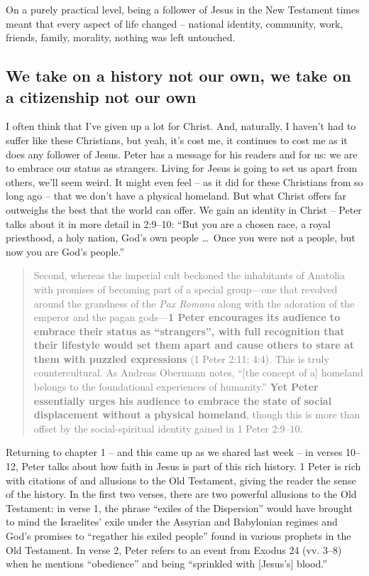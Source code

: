 On a purely practical level, being a follower of Jesus in the New Testament
times meant that every aspect of life changed -- national identity, community,
work, friends, family, morality, nothing was left untouched.

\subsection{%
    We take on a history not our own, we take on a citizenship not our own
}

I often think that I've given up a lot for Christ. And, naturally, I haven't had
to suffer like these Christians, but yeah, it's cost me, it continues to cost me
as it does any follower of Jesus. Peter has a message for his readers and for
us: we are to embrace our status as strangers. Living for Jesus is going to set
us apart from others, we'll seem weird. It might even feel -- as it did for
these Christians from so long ago -- that we don't have a physical homeland. But
what Christ offers far outweighs the best that the world can offer. We gain an
identity in Christ -- Peter talks about it in more detail in 2:9--10:
\enquote{But you are a chosen race, a royal priesthood, a holy nation, God's own
people \dots\ Once you were not a people, but now you are God's people.}

\begin{quote}
    \textcolor{gray}{%
        Second, whereas the imperial cult beckoned the inhabitants of Anatolia
        with promises of becoming part of a special group---one that revolved
        around the grandness of the \textit{Pax Romana} along with the adoration
        of the emperor and the pagan gods---\textbf{1 Peter encourages its
        audience to embrace their status as \enquote{strangers}, with full
        recognition that their lifestyle would set them apart and cause others
        to stare at them with puzzled expressions} (1 Peter 2:11; 4:4). This is
        truly countercultural. As Andreas Obermann notes, \enquote{[the concept
        of a] homeland belongs to the foundational experiences of humanity.}
        \textbf{Yet Peter essentially urges his audience to embrace the state of
        social displacement without a physical homeland}, though this is more
        than offset by the social-spiritual identity gained in 1 Peter 2:9--10.
        \autocite{himes:2017}
    }
\end{quote}

Returning to chapter 1 -- and this came up as we shared last week -- in verses
10--12, Peter talks about how faith in Jesus is part of this rich history. 1
Peter is rich with citations of and allusions to the Old Testament, giving the
reader the sense of the history. In the first two verses, there are two powerful
allusions to the Old Testament: in verse 1, the phrase \enquote{exiles of the
Dispersion} would have brought to mind the Israelites' exile under the Assyrian
and Babylonian regimes and God's promises to \enquote{regather his exiled
people} found in various prophets in the Old Testament. In verse 2, Peter refers
to an event from Exodus 24 (vv. 3--8) when he mentions \enquote{obedience} and
being \enquote{sprinkled with [Jesus's] blood.}

